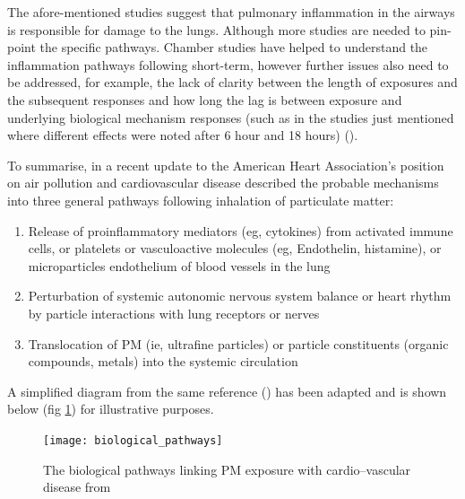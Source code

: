 The afore-mentioned studies suggest that pulmonary inflammation in the airways is responsible for damage to the lungs. Although more studies are needed to pin-point the specific pathways. Chamber studies have helped to understand the inflammation pathways following short-term, however further issues also need to be addressed, for example, the lack of clarity between the length of exposures and the subsequent responses and how long the lag is between exposure and underlying biological mechanism responses (such as in the studies just mentioned where different effects were noted after 6 hour and 18 hours) (\cite{EnvironmentalProtectionAgency2009}).

To summarise, in a recent update to the American Heart Association's position on air pollution and cardiovascular disease \cite{Brook2010} described the probable mechanisms into three general pathways following inhalation of particulate matter:

\begin{enumerate}
  \item Release of proinflammatory mediators (eg, cytokines) from activated immune cells, or platelets or vasculoactive molecules (eg, Endothelin, histamine), or microparticles endothelium of blood vessels in the lung
  \item Perturbation of systemic autonomic nervous system balance or heart rhythm by particle interactions with lung receptors or nerves
  \item Translocation of PM (ie, ultrafine particles) or particle constituents (organic compounds, metals) into the systemic circulation
\end{enumerate}


A simplified diagram from the same reference (\cite{Brook2010}) has been adapted and is shown below (fig \ref{fig:biological_pathways}) for illustrative purposes.

\begin{figure}[H]
\centering
\texttt{[image: biological\_pathways]}
\caption{The biological pathways linking PM exposure with cardio--vascular disease from \cite{Brook2010}}
\label{fig:biological_pathways}
\end{figure}


